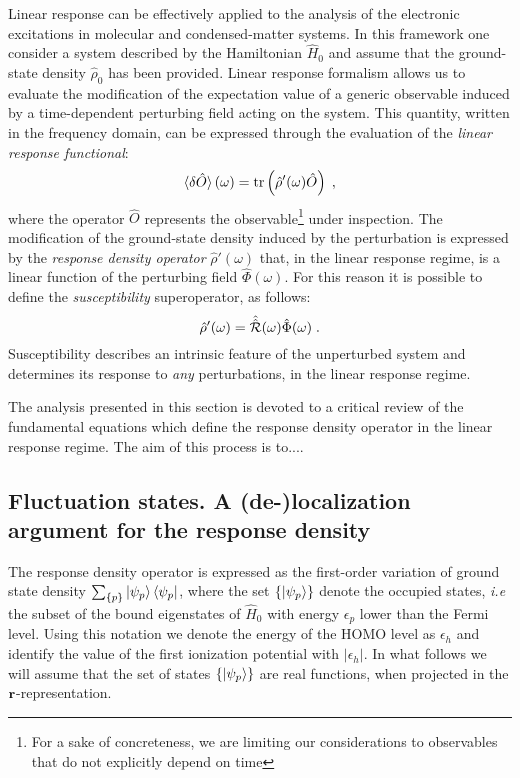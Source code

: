 \documentclass[reprint,aps,prb]{revtex4-1}
\renewcommand{\r}{{\bf r}}
\newcommand{\eps}{\epsilon}
\newcommand{\be}{\begin{equation}}
\newcommand{\ee}{\end{equation}}
\newcommand{\lb}{\label}
\newcommand{\op}[1]{\hat {#1}}
\newcommand{\sop}[1]{\op{\op {#1}}}
\newcommand{\trace}[1]{\mathrm{tr}\left(#1\right)}
\newcommand{\dmnot}{\op{\rho}_0}
\newcommand{\dm}{\op{\rho}}
\newcommand{\hnot}{\op{H}_0}
\begin{document}
Linear response can be effectively applied to the analysis of the electronic excitations in molecular and condensed-matter systems. In this framework one consider a system 
described by the Hamiltonian $\hnot$ and assume that the ground-state density $\dmnot$ has been provided. Linear response formalism allows us to evaluate the modification 
of the expectation value of a generic observable induced by a time-dependent perturbing field acting on the system. This quantity, written in the frequency domain, can be expressed 
through the evaluation of the \emph{linear response functional}:
\be\lb{LinearResponseFunctDef1}
\braket{\delta\op O}(\omega) = \trace{\dm'(\omega)\op O} \;,
\ee
where the operator $\op O$ represents the observable\footnote{For a sake of concreteness, we are limiting our considerations to observables that do not explicitly depend on time} 
under inspection. The modification of the ground-state density induced by the perturbation is expressed by the \emph{response density operator} $\dm'(\omega)$ that, in the linear 
response regime, is a linear function of the perturbing field $\op\Phi(\omega)$. For this reason it is possible to define the \emph{susceptibility} superoperator, as follows:
\be\lb{SusceptibilityDef1}
\dm'(\omega) = \sop{{\cal R}}(\omega) \op\Phi(\omega) \;. 
\ee
Susceptibility describes an intrinsic feature of the unperturbed system and determines its response to \emph{any} perturbations, in the linear response regime.

The analysis presented in this section is devoted to a critical review of the fundamental equations which define the response density operator in the linear response regime.    
The aim of this process is to....


\subsection{Fluctuation states. A (de-)localization argument for the response density}

The response density operator is expressed as the first-order variation of ground state density $\sum_{\{p\}} \ket{\psi_p} \bra{\psi_p}$, where the set $\{\ket{\psi_p}\}$ denote the 
occupied states, \emph{i.e} the subset of the bound eigenstates of $\hnot$ with energy $\eps_p$ lower than the Fermi level. Using this notation we denote the energy of the HOMO level 
as $\eps_h$ and identify the value of the first ionization potential with $|\eps_h|$. In what follows we will assume that the set of states $\{\ket{\psi_p}\}$ are real functions, when 
projected in the $\r$-representation.  
\end{document}
